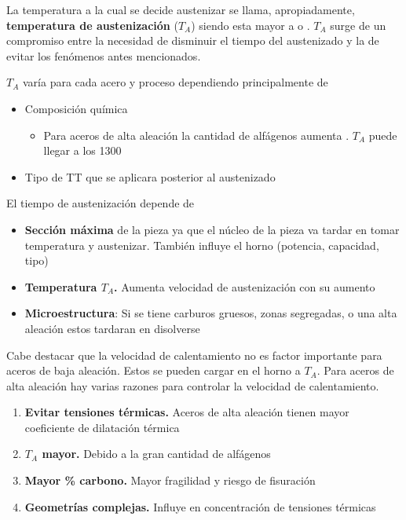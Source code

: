 La temperatura a la cual se decide austenizar se llama, apropiadamente, \textbf{temperatura de austenización} ($T_A$) siendo esta mayor a \Athree{} o \Acm{}. $T_A$ surge de un compromiso entre la necesidad de disminuir el tiempo del austenizado y la de evitar los fenómenos antes mencionados. 

$T_A$ varía para cada acero y proceso dependiendo principalmente de
\begin{itemize}
    \item Composición química
    \begin{itemize}
    	\item Para aceros de alta aleaci\'on la cantidad de alf\'agenos aumenta \Athree. $T_A$ puede llegar a los 1300\grad~
    \end{itemize}
    \item Tipo de TT que se aplicara posterior al austenizado
\end{itemize}

El tiempo de austenización depende de
\begin{itemize}
    \item \textbf{Sección máxima} de la pieza ya que el núcleo de la pieza va tardar en tomar temperatura y austenizar. También influye el horno (potencia, capacidad, tipo)
    \item \textbf{Temperatura $T_A$.} Aumenta velocidad de austenización con su aumento
    \item \textbf{Microestructura}: Si se tiene carburos gruesos, zonas segregadas, o una alta aleación estos tardaran en disolverse
\end{itemize}

Cabe destacar que la velocidad de calentamiento no es factor importante para aceros de baja aleación. Estos se pueden cargar en el horno a $T_A$. Para aceros de alta aleación hay varias razones para controlar la velocidad de calentamiento.
\begin{enumerate}
    \item \textbf{Evitar tensiones térmicas.} Aceros de alta aleación tienen mayor coeficiente de dilatación térmica
    \item \textbf{$T_A$ mayor.} Debido a la gran cantidad de alfágenos
    \item \textbf{Mayor \% carbono.} Mayor fragilidad y riesgo de fisuración
    \item \textbf{Geometrías complejas.} Influye en concentración de tensiones térmicas
\end{enumerate}

